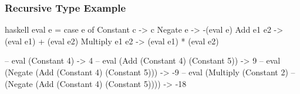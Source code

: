\documentclass[dvipsnames]{beamer}
\theoremstyle{plain}
\begin{document}
\begin{frame}[fragile]
  \frametitle{Recursive Type Example}

  \begin{example}
    \pause
    \begin{pygments}{haskell}
eval e =
    case e of
      Constant c -> c
      Negate e -> -(eval e)
      Add e1 e2 -> (eval e1) + (eval e2)
      Multiply e1 e2 -> (eval e1) * (eval e2)

-- eval (Constant 4) -> 4
-- eval (Add (Constant 4) (Constant 5)) -> 9
-- eval (Negate (Add (Constant 4) (Constant 5))) -> -9
-- eval (Multiply (Constant 2)
--         (Negate (Add (Constant 4) (Constant 5)))) -> -18
    \end{pygments}
  \end{example}
\end{frame}
\end{document}

